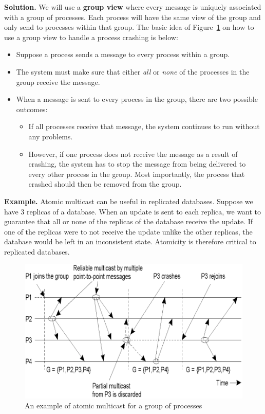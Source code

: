 \documentclass[twoside]{article}
\begin{document}
\textbf{Solution.} We will use a \textbf{group view} where every message is uniquely associated with a group of processes. Each process will have the same view of the group and only send to processes within that group. The basic idea of Figure~\ref{fig:atomic-multicast-example} on how to use a group view to handle a process crashing is below: 
\begin{itemize}
    \item Suppose a process sends a message to every process within a group.
    \item The system must make sure that either \emph{all} or \emph{none} of the processes in the group receive the message.
    \item When a message is sent to every process in the group, there are two possible outcomes:
        \begin{itemize}
            \item If all processes receive that message, the system continues to run without any problems. 
            \item However, if one process does not receive the message as a result of crashing, the system has to stop the message from being delivered to every other process in the group. Most importantly, the process that crashed should then be removed from the group.
        \end{itemize}
\end{itemize}

\textbf{Example.} Atomic multicast can be useful in replicated databases. Suppose we have $3$ replicas of a database. When an update is sent to each replica, we want to guarantee that all or none of the replicas of the database receive the update. If one of the replicas were to not receive the update unlike the other replicas, the database would be left in an inconsistent state. Atomicity is therefore critical to replicated databases.

\begin{figure}[h]
	\centering
    \includegraphics[scale=0.3]{atomic-multicast-example.png}
	\caption{An example of atomic multicast for a group of processes}
	\label{fig:atomic-multicast-example}
\end{figure}
\end{document}
